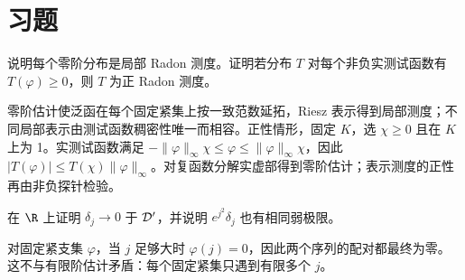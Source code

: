 \section{习题}
\begin{exercise}[零阶与正性]
说明每个零阶分布是局部 Radon 测度。证明若分布 $T$ 对每个非负实测试函数有 $T(\varphi)\ge0$，则 $T$ 为正 Radon 测度。
\end{exercise}
\begin{solution}
零阶估计使泛函在每个固定紧集上按一致范数延拓，Riesz 表示得到局部测度；不同局部表示由测试函数稠密性唯一而相容。正性情形，固定 $K$，选 $\chi\ge0$ 且在 $K$ 上为 1。实测试函数满足 $-\|\varphi\|_\infty\chi\le\varphi\le\|\varphi\|_\infty\chi$，因此 $|T(\varphi)|\le T(\chi)\|\varphi\|_\infty$。对复函数分解实虚部得到零阶估计；表示测度的正性再由非负探针检验。
\end{solution}
\begin{exercise}[无穷远的点质量]
在 $\R$ 上证明 $\delta_j\to0$ 于 $\mathcal{D}'$，并说明 $e^{j^2}\delta_j$ 也有相同弱极限。
\end{exercise}
\begin{solution}
对固定紧支集 $\varphi$，当 $j$ 足够大时 $\varphi(j)=0$，因此两个序列的配对都最终为零。这不与有限阶估计矛盾：每个固定紧集只遇到有限多个 $j$。
\end{solution}
